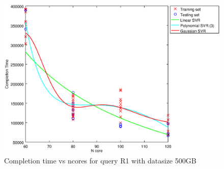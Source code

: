 
\begin {figure}[hbtp]
\centering
\includegraphics[width=\textwidth]{output/R1_500_ONLY_1_OVER_NCORES/plot_R1_500_bestmodels.eps}
\caption{Completion time vs ncores for query R1 with datasize 500GB}
\label{fig:all_nonlinear_R1_500}
\end {figure}
